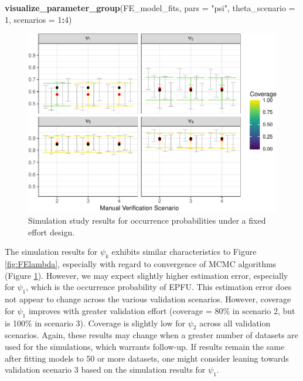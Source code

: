 \documentclass[
]{article}
\newenvironment{Shaded}{\begin{snugshade}}{\end{snugshade}}
\newcommand{\AttributeTok}[1]{\textcolor[rgb]{0.13,0.29,0.53}{#1}}
\newcommand{\DecValTok}[1]{\textcolor[rgb]{0.00,0.00,0.81}{#1}}
\newcommand{\FunctionTok}[1]{\textcolor[rgb]{0.13,0.29,0.53}{\textbf{#1}}}
\newcommand{\NormalTok}[1]{#1}
\newcommand{\SpecialCharTok}[1]{\textcolor[rgb]{0.81,0.36,0.00}{\textbf{#1}}}
\newcommand{\StringTok}[1]{\textcolor[rgb]{0.31,0.60,0.02}{#1}}
\begin{document}
\linespread{1}

\begin{Shaded}
\begin{Highlighting}[]
\FunctionTok{visualize\_parameter\_group}\NormalTok{(FE\_model\_fits, }\AttributeTok{pars =} \StringTok{"psi"}\NormalTok{, }\AttributeTok{theta\_scenario =} \DecValTok{1}\NormalTok{, }\AttributeTok{scenarios =} \DecValTok{1}\SpecialCharTok{:}\DecValTok{4}\NormalTok{)}
\end{Highlighting}
\end{Shaded}

\begin{figure}
\centering
\includegraphics{Vignette_files/figure-latex/FEpsi-1.pdf}
\caption{\label{fig:FEpsi}Simulation study results for occurrence probabilities under a fixed effort design.}
\end{figure}

\linespread{1}

The simulation results for \(\psi_k\) exhibits similar characteristics to Figure \ref{fig:FElambda}, especially with regard to convergence of MCMC algorithms (Figure \ref{fig:FEpsi}). However, we may expect slightly higher estimation error, especially for \(\psi_1\), which is the occurrence probability of EPFU. This estimation error does not appear to change across the various validation scenarios. However, coverage for \(\psi_1\) improves with greater validation effort (coverage = 80\% in scenario 2, but is 100\% in scenario 3). Coverage is slightly low for \(\psi_2\) across all validation scenarios. Again, these results may change when a greater number of datasets are used for the simulations, which warrants follow-up. If results remain the same after fitting models to 50 or more datasets, one might consider leaning towards validation scenario 3 based on the simulation results for \(\psi_1\).
\end{document}
